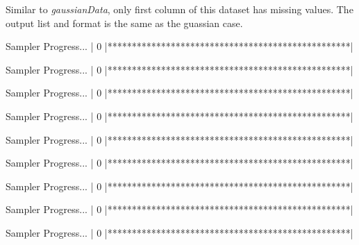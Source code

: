 \documentclass[a4paper]{article}
\begin{document}
Similar to \emph{gaussianData}, only first column of this dataset has missing values.  The output list and format is the same as the guassian case.
\begin{Schunk}
\begin{Soutput}
Sampler Progress...
| 0%      20%      40%      60%      80%      100% |
|**************************************************|


Sampler Progress...
| 0%      20%      40%      60%      80%      100% |
|**************************************************|


Sampler Progress...
| 0%      20%      40%      60%      80%      100% |
|**************************************************|


Sampler Progress...
| 0%      20%      40%      60%      80%      100% |
|**************************************************|


Sampler Progress...
| 0%      20%      40%      60%      80%      100% |
|**************************************************|


Sampler Progress...
| 0%      20%      40%      60%      80%      100% |
|**************************************************|


Sampler Progress...
| 0%      20%      40%      60%      80%      100% |
|**************************************************|


Sampler Progress...
| 0%      20%      40%      60%      80%      100% |
|**************************************************|


Sampler Progress...
| 0%      20%      40%      60%      80%      100% |
|**************************************************|



\end{Soutput}
\end{Schunk}
\end{document}
